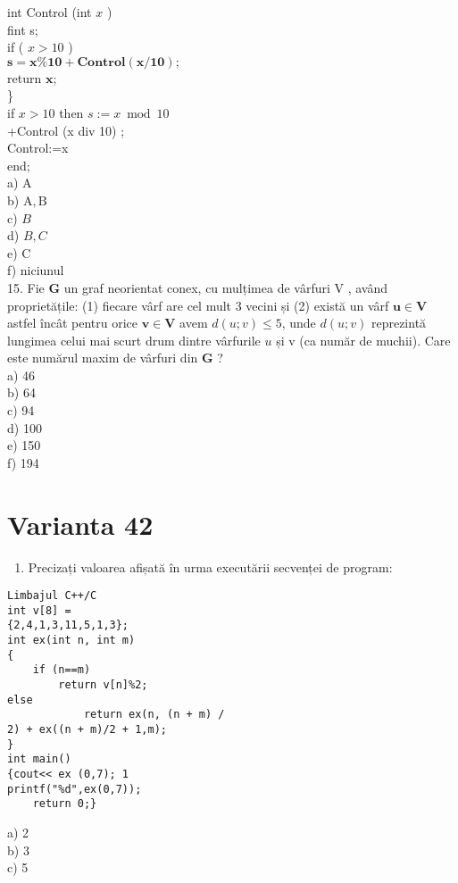 int Control (int $x$ )\\
fint s;\\
if ( $x>10$ )\\
$\mathbf{s = x \% 1 0 + C o n t r o l ( x / 1 0 ) ; ~}$\\
return $\mathbf{x}$;\\
\}\\
if $x>10$ then $s:=x \bmod 10$\\
+Control (x div 10) ;\\
Control:=x\\
end;\\
a) A\\
b) $\mathrm{A}, \mathrm{B}$\\
c) $B$\\
d) $B, C$\\
e) C\\
f) niciunul\\
15. Fie $\mathbf{G}$ un graf neorientat conex, cu mulțimea de vârfuri V , având proprietățile: (1) fiecare vârf are cel mult 3 vecini și (2) există un vârf $\mathbf{u} \in \mathbf{V}$ astfel încât pentru orice $\mathbf{v} \in \mathbf{V}$ avem $d(u ; v) \leq 5$, unde $d(u ; v)$ reprezintă lungimea celui mai scurt drum dintre vârfurile $u$ și v (ca număr de muchii). Care este numărul maxim de vârfuri din $\mathbf{G}$ ?\\
a) 46\\
b) 64\\
c) 94\\
d) 100\\
e) 150\\
f) 194

\section*{Varianta 42}
\begin{enumerate}
  \item Precizați valoarea afișată în urma executării secvenței de program:
\end{enumerate}

\begin{verbatim}
Limbajul C++/C
int v[8] =
{2,4,1,3,11,5,1,3};
int ex(int n, int m)
{
    if (n==m)
        return v[n]%2;
else
            return ex(n, (n + m) /
2) + ex((n + m)/2 + 1,m);
}
int main()
{cout<< ex (0,7); 1
printf("%d",ex(0,7));
    return 0;}
\end{verbatim}

a) 2\\
b) 3\\
c) 5

